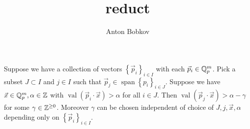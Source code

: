 \documentclass{amsart}
\title{reduct}
\author{Anton Bobkov}
\newcommand{\curly}[1]{\left\{#1\right\}}
\DeclareMathOperator{\vecspan}{span}
\DeclareMathOperator{\val}{val}
\begin{document}
\maketitle

%


\begin{Claim}
	Suppose we have a collection of vectors $\curly{\vec p_i}_{i \in I}$ with each $\vec p_i \in \mathbb{Q}_p^m$.
	Pick a subset $J \subset I$ and $j \in I$ such that $\vec p_j \in \vecspan \curly{p_i}_{i \in J}$.
	Suppose we have $\vec x \in \mathbb{Q}_p^m, \alpha \in \mathbb{Z}$ with $\val(\vec p_i \cdot \vec x) > \alpha$ for all $i \in J$.
	Then $\val(\vec p_j \cdot \vec x) > \alpha - \gamma$ for some $\gamma \in \mathbb{Z}^{\geq 0}$.
	Moreover $\gamma$ can be chosen independent of choice of $J, j, \vec x, \alpha$ depending only on $\curly{\vec p_i}_{i \in I}$.
\end{Claim}
\end{document}
